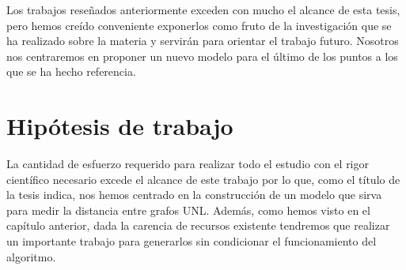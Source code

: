 \documentclass[a4paper,12pt,spanish]{book}
\begin{document}
Los trabajos reseñados anteriormente exceden con mucho el alcance de esta tesis, pero hemos
creído conveniente exponerlos como fruto de la investigación que se ha realizado sobre la
materia y servirán para orientar el trabajo futuro. Nosotros nos centraremos en proponer
un nuevo modelo para el último de los puntos a los que se ha hecho referencia.
\newpage

\chapter{Hipótesis de trabajo}
\label{3.hypothesis/index:hipotesis-de-trabajo}\label{3.hypothesis/index::doc}
La cantidad de esfuerzo requerido para realizar todo el estudio con el rigor científico
necesario excede el alcance de este trabajo por lo que, como el título de la tesis indica,
nos hemos centrado en la construcción de un modelo que sirva para medir la distancia
entre grafos UNL. Además, como hemos visto en el capítulo anterior, dada la carencia de
recursos existente tendremos que realizar un importante trabajo para generarlos sin
condicionar el funcionamiento del algoritmo.
\end{document}

